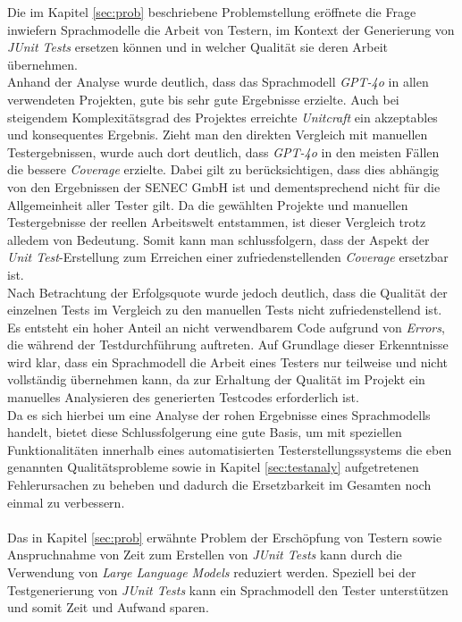 Die im Kapitel \ref{sec:prob} beschriebene Problemstellung eröffnete die Frage inwiefern Sprachmodelle die Arbeit von Testern, im Kontext der Generierung von \textit{JUnit Tests} ersetzen können und in welcher Qualität sie deren Arbeit übernehmen. \\Anhand der Analyse wurde deutlich, dass das Sprachmodell \textit{GPT-4o} in allen verwendeten Projekten, gute bis sehr gute Ergebnisse erzielte. Auch bei steigendem Komplexitätsgrad des Projektes erreichte \textit{Unitcraft} ein akzeptables und konsequentes Ergebnis. Zieht man den direkten Vergleich mit manuellen Testergebnissen, wurde auch dort deutlich, dass \textit{GPT-4o} in den meisten Fällen die bessere \textit{Coverage} erzielte. Dabei gilt zu berücksichtigen, dass dies abhängig von den Ergebnissen der SENEC GmbH ist und dementsprechend nicht für die Allgemeinheit aller Tester gilt. Da die gewählten Projekte und manuellen Testergebnisse der reellen Arbeitswelt entstammen, ist dieser Vergleich trotz alledem von Bedeutung. Somit kann man schlussfolgern, dass der Aspekt der \textit{Unit Test}-Erstellung zum Erreichen einer zufriedenstellenden \textit{Coverage} ersetzbar ist.\\ Nach Betrachtung der Erfolgsquote wurde jedoch deutlich, dass die Qualität der einzelnen Tests im Vergleich zu den manuellen Tests nicht zufriedenstellend ist. Es entsteht ein hoher Anteil an nicht verwendbarem Code aufgrund von \textit{Errors}, die während der Testdurchführung auftreten. Auf Grundlage dieser Erkenntnisse wird klar, dass ein Sprachmodell die Arbeit eines Testers nur teilweise und nicht vollständig übernehmen kann, da zur Erhaltung der Qualität im Projekt ein manuelles Analysieren des generierten Testcodes erforderlich ist. \\Da es sich hierbei um eine Analyse der rohen Ergebnisse eines Sprachmodells handelt, bietet diese Schlussfolgerung eine gute Basis, um mit speziellen Funktionalitäten innerhalb eines automatisierten Testerstellungssystems die eben genannten Qualitätsprobleme sowie in Kapitel \ref{sec:testanaly} aufgetretenen Fehlerursachen zu beheben und dadurch die Ersetzbarkeit im Gesamten noch einmal zu verbessern. \\\\Das in Kapitel \ref{sec:prob} erwähnte Problem der Erschöpfung von Testern sowie Anspruchnahme von Zeit zum Erstellen von \textit{JUnit Tests} kann durch die Verwendung von \textit{Large Language Models} reduziert werden. Speziell bei der Testgenerierung von \textit{JUnit Tests} kann ein Sprachmodell den Tester unterstützen und somit Zeit und Aufwand sparen.

